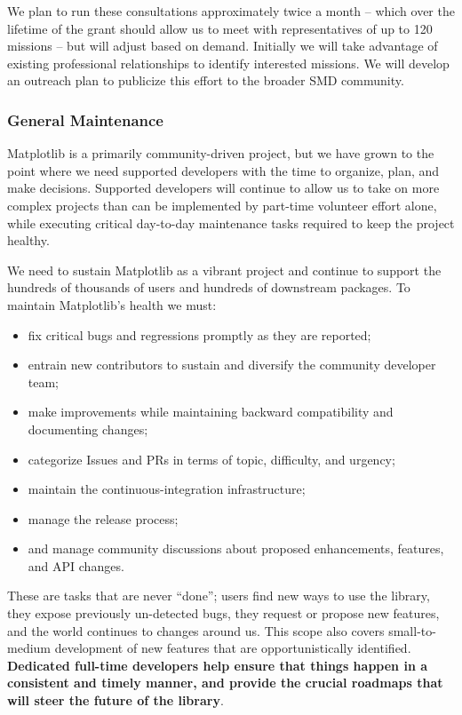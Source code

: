 \documentclass[12pt]{article}
\numberwithin{page}{section}
\begin{document}
We plan to run these consultations approximately twice a month -- which over
the lifetime of the grant should allow us to meet with representatives of up to
120 missions -- but will adjust based on demand.  Initially we will
take advantage of existing professional relationships to identify interested
missions.  We will develop an outreach plan to publicize
this effort to the broader SMD community.



\subsubsection{General Maintenance}

Matplotlib is a primarily community-driven project, but we have grown to the
point where we need supported developers with the time to organize, plan, and
make decisions.  Supported developers will continue to allow us to take on more
complex projects than can be implemented by part-time volunteer effort alone,
while executing critical day-to-day maintenance tasks required to keep the
project healthy.


We need to sustain Matplotlib as a vibrant project and continue to support the
hundreds of thousands of users and hundreds of downstream packages.  To maintain
Matplotlib's health we must:
\begin{itemize}[noitemsep]
\item fix critical bugs and regressions promptly as they are reported;
\item entrain new contributors to sustain and diversify the community
  developer team;
\item make improvements while maintaining backward compatibility and
  documenting changes;
\item categorize Issues and PRs in terms of topic, difficulty, and
  urgency;
\item maintain the continuous-integration infrastructure;
\item manage the release process;
\item and manage community discussions about proposed enhancements, features,
  and API changes.
\end{itemize}
These are tasks that are never ``done''; users find new ways to use the
library, they expose previously un-detected bugs, they request or propose new
features, and the world continues to changes around us.  This scope also covers
small-to-medium development of new features that are opportunistically
identified.  \textbf{Dedicated full-time developers help ensure that things
  happen in a consistent and timely manner, and provide the crucial roadmaps
  that will steer the future of the library}.
\end{document}
